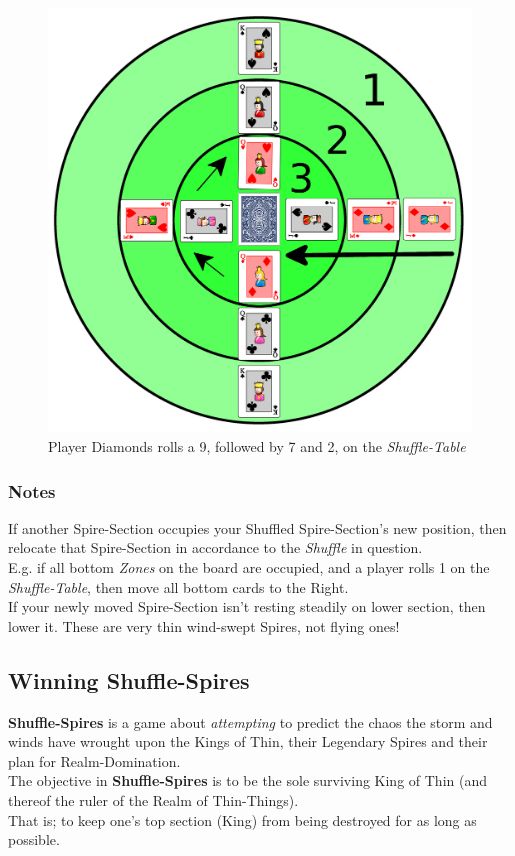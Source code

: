 \documentclass[11pt,twocolumn]{article}
\begin{document}
\begin{figure}[h!]
\centering
\includegraphics[scale=0.08]{shuffle.png}
\caption{Player Diamonds rolls a 9, followed by 7 and 2, on the \textit{Shuffle-Table}}
\label{starting}
\end{figure}

\subsubsection{Notes}
If another Spire-Section occupies your Shuffled Spire-Section's new position, then relocate that Spire-Section in accordance to the \textit{Shuffle} in question. \\
E.g. if all bottom \textit{Zones} on the board are occupied, and a player rolls 1 on the \textit{Shuffle-Table}, then move all bottom cards to the Right. \\

\noindent
If your newly moved Spire-Section isn't resting steadily on lower section, then lower it. These are very thin wind-swept Spires, not flying ones!

\subsection{Winning \textbf{Shuffle-Spires}}
\textbf{Shuffle-Spires} is a game about \textit{attempting} to predict the chaos the storm and winds have wrought upon the Kings of Thin, their Legendary Spires and their plan for Realm-Domination. \\
The objective in \textbf{Shuffle-Spires} is to be the sole surviving King of Thin (and thereof the ruler of the Realm of Thin-Things). \\
That is; to keep one’s top section (King) from being destroyed for as long as possible.
\end{document}
